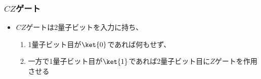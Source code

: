 \begin{frame}
  \frametitle{$CZ$ゲート}

  \pause
  \begin{itemize}
    \item<+-> $CZ$ゲートは2量子ビットを入力に持ち、
    \begin{enumerate}
      \item 1量子ビット目が$\ket{0}$であれば何もせず、
      \item 一方で1量子ビット目が$\ket{1}$であれば2量子ビット目に$Z$ゲートを作用させる
    \end{enumerate}
  \end{itemize}

  \pause

  \pause
\end{frame}

